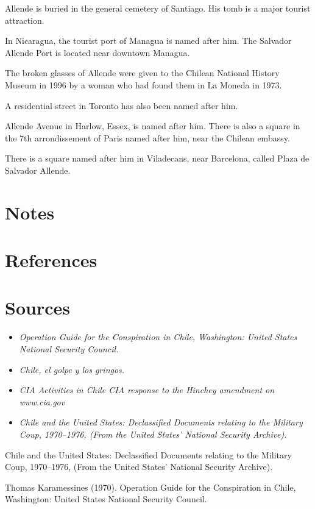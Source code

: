 Allende is buried in the general cemetery of Santiago. His tomb is a
major tourist attraction.

In Nicaragua, the tourist port of Managua is named after him. The
Salvador Allende Port is located near downtown Managua.

The broken glasses of Allende were given to the Chilean National History
Museum in 1996 by a woman who had found them in La Moneda in 1973.

A residential street in Toronto has also been named after him.

Allende Avenue in Harlow, Essex, is named after him. There is also a
square in the 7th arrondissement of Paris named after him, near the
Chilean embassy.

There is a square named after him in Viladecans, near Barcelona, called
Plaza de Salvador Allende.

\section{Notes}\label{notes}

\section{References}\label{references}

\section{Sources}\label{sources}

\begin{itemize}
\item
  \emph{Operation Guide for the Conspiration in Chile, Washington:
  United States National Security Council.}
\item
  \emph{Chile, el golpe y los gringos.}
\item
  \emph{CIA Activities in Chile CIA response to the Hinchey amendment on
  www.cia.gov}
\item
  \emph{Chile and the United States: Declassified Documents relating to
  the Military Coup, 1970--1976, (From the United States' National
  Security Archive).}
\end{itemize}

Chile and the United States: Declassified Documents relating to the
Military Coup, 1970--1976, (From the United States' National Security
Archive).

Thomas Karamessines (1970). Operation Guide for the Conspiration in
Chile, Washington: United States National Security Council.

